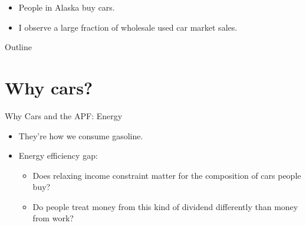\documentclass[aspectratio=169]{beamer}
\begin{document}
{  %
\begin{frame}[plain]
\end{frame}
}

\begin{frame}
	\begin{itemize}
		\item People in Alaska buy cars.
		\item I observe a large fraction of wholesale used car market sales.
	\end{itemize}
\end{frame}

{  %
\begin{frame}[plain]
\end{frame}
}
%
%
%
%

\begin{frame}{Outline}
	\tableofcontents
\end{frame}

\section[Cars]{Why cars?}

\begin{frame}{Why Cars and the APF: Energy}
	\begin{itemize}
		\item They're how we consume gasoline.
		\item Energy efficiency gap:
		\begin{itemize}
			\item Does relaxing income constraint matter for the composition of cars people buy?
			\item Do people treat money from this kind of dividend differently than money from work?
		\end{itemize}
	\end{itemize}
\end{frame}
\end{document}

